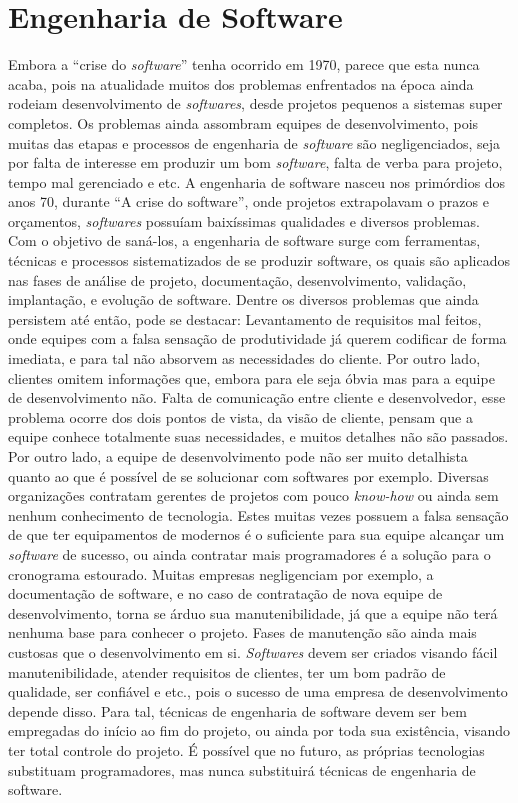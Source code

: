 \section{Engenharia de Software}
Embora a “crise do \textit{software}” tenha ocorrido em 1970, parece que esta nunca acaba, pois na atualidade muitos dos problemas enfrentados na época ainda rodeiam desenvolvimento de \textit{softwares}, desde projetos pequenos a sistemas super completos. Os problemas ainda assombram equipes de desenvolvimento, pois muitas das etapas e processos de engenharia de \textit{software} são negligenciados, seja por falta de interesse em produzir um bom \textit{software}, falta de verba para projeto, tempo mal gerenciado e etc.
A engenharia de software nasceu nos primórdios dos anos 70, durante “A crise do software”, onde projetos extrapolavam o prazos e orçamentos, \textit{softwares} possuíam baixíssimas qualidades e diversos problemas. Com o objetivo de saná-los, a engenharia de software surge com ferramentas, técnicas e processos sistematizados de se produzir software, os quais são aplicados nas fases de análise de projeto, documentação, desenvolvimento, validação, implantação, e evolução de software.
Dentre os diversos problemas que ainda persistem até então, pode se destacar:
Levantamento de requisitos mal feitos, onde equipes com a falsa sensação de produtividade já querem codificar de forma imediata, e para tal não absorvem as necessidades do cliente. Por outro lado, clientes omitem informações que, embora para ele seja óbvia mas para a equipe de desenvolvimento não.
Falta de comunicação entre cliente e desenvolvedor, esse problema ocorre dos dois pontos de vista, da visão de cliente, pensam que a equipe conhece totalmente suas necessidades, e muitos detalhes não são passados. Por outro lado, a equipe de desenvolvimento pode não ser muito detalhista quanto ao que é possível de se solucionar com softwares por exemplo.
Diversas organizações contratam gerentes de projetos com pouco \textit{know-how} ou ainda sem nenhum conhecimento de tecnologia. Estes muitas vezes possuem a falsa sensação de que ter equipamentos de modernos é o suficiente para sua equipe alcançar um \textit{software} de sucesso, ou ainda contratar mais programadores é a solução para o cronograma estourado.
Muitas empresas negligenciam por exemplo, a documentação de software, e no caso de contratação de nova equipe de desenvolvimento, torna se árduo sua manutenibilidade, já que a equipe não terá nenhuma base para conhecer o projeto. Fases de manutenção são ainda mais custosas que o desenvolvimento em si. \textit{Softwares} devem ser criados visando fácil manutenibilidade, atender requisitos de clientes, ter um bom padrão de qualidade, ser confiável e etc., pois o sucesso de uma empresa de desenvolvimento depende disso.
Para tal, técnicas de engenharia de software devem ser bem empregadas do início ao fim do projeto, ou ainda por toda sua existência, visando ter total controle do projeto. É possível que no futuro, as próprias tecnologias substituam programadores, mas nunca substituirá técnicas de engenharia de software.
\cite{engenhariadesoftware}


